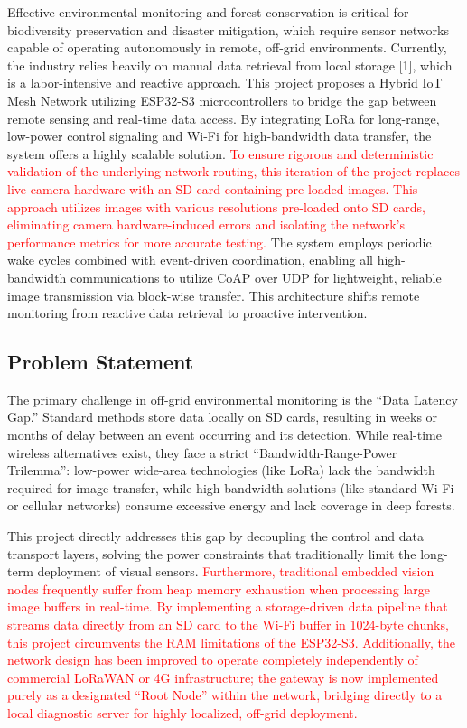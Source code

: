 \documentclass[12pt,a4paper]{article}
\newcommand{\changed}[1]{\textcolor{red}{#1}}
\begin{document}
Effective environmental monitoring and forest conservation is critical for biodiversity preservation and disaster mitigation, which require sensor networks capable of operating autonomously in remote, off-grid environments. Currently, the industry relies heavily on manual data retrieval from local storage [1], which is a labor-intensive and reactive approach. This project proposes a Hybrid IoT Mesh Network utilizing ESP32-S3 microcontrollers to bridge the gap between remote sensing and real-time data access. By integrating LoRa for long-range, low-power control signaling and Wi-Fi for high-bandwidth data transfer, the system offers a highly scalable solution. \changed{To ensure rigorous and deterministic validation of the underlying network routing, this iteration of the project replaces live camera hardware with an SD card containing pre-loaded images. This approach utilizes images with various resolutions pre-loaded onto SD cards, eliminating camera hardware-induced errors and isolating the network's performance metrics for more accurate testing.} The system employs periodic wake cycles combined with event-driven coordination, enabling all high-bandwidth communications to utilize CoAP over UDP for lightweight, reliable image transmission via block-wise transfer. This architecture shifts remote monitoring from reactive data retrieval to proactive intervention.

\subsection{Problem Statement}

The primary challenge in off-grid environmental monitoring is the ``Data Latency Gap.'' Standard methods store data locally on SD cards, resulting in weeks or months of delay between an event occurring and its detection. While real-time wireless alternatives exist, they face a strict ``Bandwidth-Range-Power Trilemma'': low-power wide-area technologies (like LoRa) lack the bandwidth required for image transfer, while high-bandwidth solutions (like standard Wi-Fi or cellular networks) consume excessive energy and lack coverage in deep forests.

This project directly addresses this gap by decoupling the control and data transport layers, solving the power constraints that traditionally limit the long-term deployment of visual sensors. \changed{Furthermore, traditional embedded vision nodes frequently suffer from heap memory exhaustion when processing large image buffers in real-time. By implementing a storage-driven data pipeline that streams data directly from an SD card to the Wi-Fi buffer in 1024-byte chunks, this project circumvents the RAM limitations of the ESP32-S3. Additionally, the network design has been improved to operate completely independently of commercial LoRaWAN or 4G infrastructure; the gateway is now implemented purely as a designated ``Root Node'' within the network, bridging directly to a local diagnostic server for highly localized, off-grid deployment.}
\end{document}

